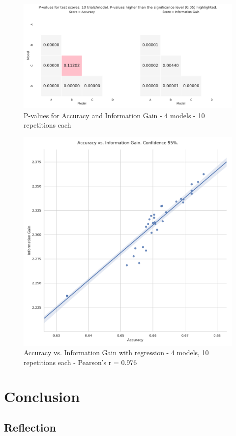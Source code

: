 \documentclass[10pt,journal,compsoc, onecolumn]{IEEEtran}
\begin{document}
\begin{figure}[h]
    \centering
    \includegraphics[width=.9\linewidth]{images/chart_28.pdf}
    \caption{P-values for Accuracy and Information Gain - 4 models - 10 repetitions each}
    \label{fig:pvalues}
\end{figure}

\begin{figure}[h]
    \centering
    \includegraphics[width=.7\linewidth]{images/chart_27.pdf}
    \caption{Accuracy vs. Information Gain with regression - 4 models, 10 repetitions each - Pearson's r = 0.976}
    \label{fig:regression}
\end{figure}


\section{Conclusion}

\subsection{Reflection}
\end{document}
